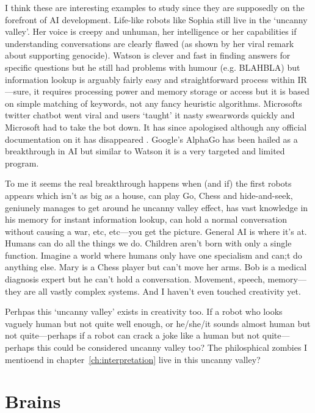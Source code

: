 \documentclass[11pt]{thesis} %
\begin{document}
I think these are interesting examples to study since they are supposedly on the forefront of \ac{AI} development. Life-like robots like Sophia still live in the `uncanny valley'. Her voice is creepy and unhuman, her intelligence or her capabilities if understanding conversations are clearly flawed (as shown by her viral remark about supporting genocide). Watson is clever and fast in finding answers for specific questions but he still had problems with humour (e.g. BLAHBLA) but information lookup is arguably fairly easy and straightforward process within \ac{IR}---sure, it requires processing power and memory storage or access but it is based on simple matching of keywords, not any fancy heuristic algorithms. Microsofts twitter chatbot went viral and users `taught' it nasty swearwords  quickly and Microsoft had to take the bot down. It has since apologised although any official documentation on it has disappeared . Google's AlphaGo has been hailed as a breakthrough in \ac{AI} but similar to Watson it is a very targeted and limited program. 

To me it seems the real breakthrough happens when (and if) the first robots appears which isn't as big as a house, can play Go, Chess and hide-and-seek, geniunely manages to get around he uncanny valley effect, has vast knowledge in his memory for instant information lookup, can hold a normal conversation without causing a war, etc, etc---you get the picture. General \ac{AI} is where it's at. Humans can do all the things we do. Children aren't born with only a single function. Imagine a world where humans only have one specialism and can;t do anything else. Mary is a Chess player but can't move her arms. Bob is a medical diagnosis expert but he can't hold a conversation. Movement, speech, memory---they are all vastly complex systems. And I haven't even touched creativity yet.

Perhpas this `uncanny valley' exists in creativity too. If a robot who looks vaguely human but not quite well enough, or he/she/it sounds almost human but not quite---perhaps if a robot can crack a joke like a human but not quite---perhaps this could be considered uncanny valley too? The philosphical zombies I mentioend in chapter~\ref{ch:interpretation} live in this uncanny valley?



\section{Brains}
\end{document}
